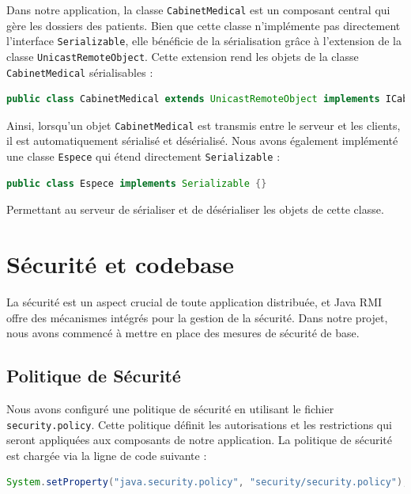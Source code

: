 \documentclass{article} %
\begin{document}
Dans notre application, la classe \texttt{CabinetMedical} est un composant central qui gère
les dossiers des patients. Bien que cette classe n'implémente pas directement l'interface \texttt{Serializable},
elle bénéficie de la sérialisation grâce à l'extension de la classe \texttt{UnicastRemoteObject}.
Cette extension rend les objets de la classe \texttt{CabinetMedical} sérialisables :
\begin{lstlisting}[language=Java]
    public class CabinetMedical extends UnicastRemoteObject implements ICabinetMedical {}
\end{lstlisting}
Ainsi, lorsqu'un objet \texttt{CabinetMedical} est transmis entre le serveur et les clients,
il est automatiquement sérialisé et désérialisé.
Nous avons également implémenté une classe \texttt{Espece} qui étend directement \texttt{Serializable} :
\begin{lstlisting}[language=Java]
    public class Espece implements Serializable {}
\end{lstlisting}
Permettant au serveur de sérialiser et de désérialiser les objets de cette classe.

\newpage
\section{Sécurité et codebase}\label{sec:securite}

La sécurité est un aspect crucial de toute application distribuée,
et Java RMI offre des mécanismes intégrés pour la gestion de la sécurité.
Dans notre projet, nous avons commencé à mettre en place des mesures de sécurité de base.

\subsection{Politique de Sécurité}

\begin{sloppypar}
    Nous avons configuré une politique de sécurité en utilisant le fichier \texttt{security.policy}.
    Cette politique définit les autorisations et les restrictions qui seront appliquées aux
    composants de notre application. La politique de sécurité est chargée via la ligne de code suivante :
\end{sloppypar}

\begin{lstlisting}[language=Java]
System.setProperty("java.security.policy", "security/security.policy");
\end{lstlisting}
\end{document}
